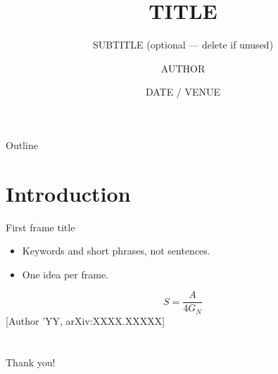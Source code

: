 \documentclass[11pt,aspectratio=169]{beamer}
\title{TITLE}
\subtitle{SUBTITLE (optional — delete if unused)}
\author{AUTHOR}
\institute{INSTITUTE}
\date{DATE / VENUE}
\begin{document}
\begin{frame}
  \titlepage
\end{frame}

\begin{frame}{Outline}
  \tableofcontents
\end{frame}

\section{Introduction}

\begin{frame}{First frame title}
  \begin{itemize}
    \item Keywords and short phrases, not sentences.
    \item One idea per frame.
  \end{itemize}
  \[
    S = \frac{A}{4 G_N}
  \]
  \hfill{\scriptsize [Author '{}YY, arXiv:XXXX.XXXXX]}
\end{frame}

\section*{}

\begin{frame}[standout]
  Thank you!
\end{frame}
\end{document}
